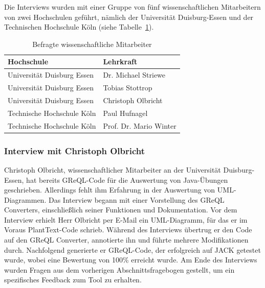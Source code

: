 Die Interviews wurden mit einer Gruppe von fünf wissenschaftlichen Mitarbeitern von zwei Hochschulen geführt, nämlich
der Universität Duisburg-Essen und der Technischen Hochschule Köln (siehe Tabelle~\ref{tab:personnen}).

\begin{table}
    \centering
    \caption{Befragte wissenschaftliche Mitarbeiter} \label{tab:personnen}
    \begin{adjustbox}{scale=0.9}
        \begin{tabular}{ll}
            \toprule
            \textbf{Hochschule} & \textbf{Lehrkraft} \\
            \midrule
            Universität Duisburg Essen & Dr. Michael Striewe \\
            \midrule
            Universität Duisburg Essen & Tobias Stottrop \\
            \midrule
            Universität Duisburg Essen & Christoph Olbricht \\
            \midrule
            Technische Hochschule Köln & Paul Hufnagel \\
            \midrule
            Technische Hochschule Köln & Prof. Dr. Mario Winter \\
            \bottomrule
        \end{tabular}
    \end{adjustbox}
\end{table}

\subsubsection{Interview mit Christoph Olbricht}
Christoph Olbricht, wissenschaftlicher Mitarbeiter an der Universität Duisburg-Essen, hat bereits GReQL-Code für die
Auswertung von Java-Übungen geschrieben. Allerdings fehlt ihm Erfahrung in der Auswertung von UML-Diagrammen. Das
Interview begann mit einer Vorstellung des GReQL Converters, einschließlich seiner Funktionen und Dokumentation. Vor
dem Interview erhielt Herr Olbricht per E-Mail ein UML-Diagramm, für das er im Voraus PlantText-Code schrieb. Während
des Interviews übertrug er den Code auf den GReQL Converter, annotierte ihn und führte mehrere Modifikationen durch.
Nachfolgend generierte er GReQL-Code, der erfolgreich auf JACK getestet wurde, wobei eine Bewertung von 100\% erreicht
wurde. Am Ende des Interviews wurden Fragen aus dem vorherigen Abschnittsfragebogen gestellt, um ein spezifisches
Feedback zum Tool zu erhalten.

